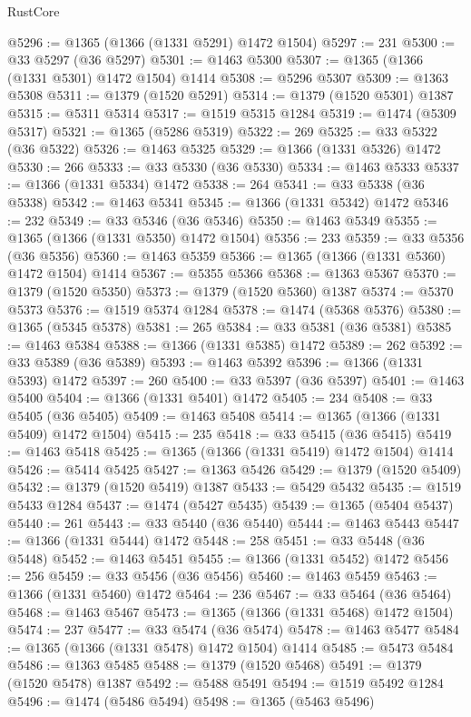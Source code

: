 \begin{lexlean}{RustCore}
\begin{coremodule}
@5296 := @1365 (@1366 (@1331 @5291) @1472 @1504)
@5297 := 231
@5300 := @33 @5297 (@36 @5297)
@5301 := @1463 @5300
@5307 := @1365 (@1366 (@1331 @5301) @1472 @1504) @1414
@5308 := @5296 @5307
@5309 := @1363 @5308
@5311 := @1379 (@1520 @5291)
@5314 := @1379 (@1520 @5301) @1387
@5315 := @5311 @5314
@5317 := @1519 @5315 @1284
@5319 := @1474 (@5309 @5317)
@5321 := @1365 (@5286 @5319)
@5322 := 269
@5325 := @33 @5322 (@36 @5322)
@5326 := @1463 @5325
@5329 := @1366 (@1331 @5326) @1472
@5330 := 266
@5333 := @33 @5330 (@36 @5330)
@5334 := @1463 @5333
@5337 := @1366 (@1331 @5334) @1472
@5338 := 264
@5341 := @33 @5338 (@36 @5338)
@5342 := @1463 @5341
@5345 := @1366 (@1331 @5342) @1472
@5346 := 232
@5349 := @33 @5346 (@36 @5346)
@5350 := @1463 @5349
@5355 := @1365 (@1366 (@1331 @5350) @1472 @1504)
@5356 := 233
@5359 := @33 @5356 (@36 @5356)
@5360 := @1463 @5359
@5366 := @1365 (@1366 (@1331 @5360) @1472 @1504) @1414
@5367 := @5355 @5366
@5368 := @1363 @5367
@5370 := @1379 (@1520 @5350)
@5373 := @1379 (@1520 @5360) @1387
@5374 := @5370 @5373
@5376 := @1519 @5374 @1284
@5378 := @1474 (@5368 @5376)
@5380 := @1365 (@5345 @5378)
@5381 := 265
@5384 := @33 @5381 (@36 @5381)
@5385 := @1463 @5384
@5388 := @1366 (@1331 @5385) @1472
@5389 := 262
@5392 := @33 @5389 (@36 @5389)
@5393 := @1463 @5392
@5396 := @1366 (@1331 @5393) @1472
@5397 := 260
@5400 := @33 @5397 (@36 @5397)
@5401 := @1463 @5400
@5404 := @1366 (@1331 @5401) @1472
@5405 := 234
@5408 := @33 @5405 (@36 @5405)
@5409 := @1463 @5408
@5414 := @1365 (@1366 (@1331 @5409) @1472 @1504)
@5415 := 235
@5418 := @33 @5415 (@36 @5415)
@5419 := @1463 @5418
@5425 := @1365 (@1366 (@1331 @5419) @1472 @1504) @1414
@5426 := @5414 @5425
@5427 := @1363 @5426
@5429 := @1379 (@1520 @5409)
@5432 := @1379 (@1520 @5419) @1387
@5433 := @5429 @5432
@5435 := @1519 @5433 @1284
@5437 := @1474 (@5427 @5435)
@5439 := @1365 (@5404 @5437)
@5440 := 261
@5443 := @33 @5440 (@36 @5440)
@5444 := @1463 @5443
@5447 := @1366 (@1331 @5444) @1472
@5448 := 258
@5451 := @33 @5448 (@36 @5448)
@5452 := @1463 @5451
@5455 := @1366 (@1331 @5452) @1472
@5456 := 256
@5459 := @33 @5456 (@36 @5456)
@5460 := @1463 @5459
@5463 := @1366 (@1331 @5460) @1472
@5464 := 236
@5467 := @33 @5464 (@36 @5464)
@5468 := @1463 @5467
@5473 := @1365 (@1366 (@1331 @5468) @1472 @1504)
@5474 := 237
@5477 := @33 @5474 (@36 @5474)
@5478 := @1463 @5477
@5484 := @1365 (@1366 (@1331 @5478) @1472 @1504) @1414
@5485 := @5473 @5484
@5486 := @1363 @5485
@5488 := @1379 (@1520 @5468)
@5491 := @1379 (@1520 @5478) @1387
@5492 := @5488 @5491
@5494 := @1519 @5492 @1284
@5496 := @1474 (@5486 @5494)
@5498 := @1365 (@5463 @5496)

\end{coremodule}
\end{lexlean}
